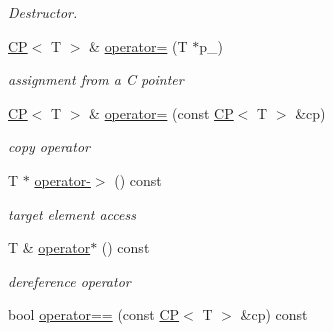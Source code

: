 \begin{DoxyCompactItemize}
\begin{DoxyCompactList}\small\item\em Destructor. \item\end{DoxyCompactList}\item 
\hypertarget{classhdnum_1_1CP_acadabf2279d172f35acb2a7d2f708776}{
\hyperlink{classhdnum_1_1CP}{CP}$<$ T $>$ \& \hyperlink{classhdnum_1_1CP_acadabf2279d172f35acb2a7d2f708776}{operator=} (T $\ast$p\_\-)}
\label{classhdnum_1_1CP_acadabf2279d172f35acb2a7d2f708776}

\begin{DoxyCompactList}\small\item\em assignment from a C pointer \item\end{DoxyCompactList}\item 
\hypertarget{classhdnum_1_1CP_ae98fff24e4e6e981f86f04aa2241324a}{
\hyperlink{classhdnum_1_1CP}{CP}$<$ T $>$ \& \hyperlink{classhdnum_1_1CP_ae98fff24e4e6e981f86f04aa2241324a}{operator=} (const \hyperlink{classhdnum_1_1CP}{CP}$<$ T $>$ \&cp)}
\label{classhdnum_1_1CP_ae98fff24e4e6e981f86f04aa2241324a}

\begin{DoxyCompactList}\small\item\em copy operator \item\end{DoxyCompactList}\item 
\hypertarget{classhdnum_1_1CP_a2b24f8dfb8382e01a16a17ae4d65c68f}{
T $\ast$ \hyperlink{classhdnum_1_1CP_a2b24f8dfb8382e01a16a17ae4d65c68f}{operator-\/$>$} () const }
\label{classhdnum_1_1CP_a2b24f8dfb8382e01a16a17ae4d65c68f}

\begin{DoxyCompactList}\small\item\em target element access \item\end{DoxyCompactList}\item 
\hypertarget{classhdnum_1_1CP_a923fbd611e128b2c45edd3f6d2ff9326}{
T \& \hyperlink{classhdnum_1_1CP_a923fbd611e128b2c45edd3f6d2ff9326}{operator$\ast$} () const }
\label{classhdnum_1_1CP_a923fbd611e128b2c45edd3f6d2ff9326}

\begin{DoxyCompactList}\small\item\em dereference operator \item\end{DoxyCompactList}\item 
\hypertarget{classhdnum_1_1CP_a9d8b201344b1cf82d1e9b1012efdff8f}{
bool \hyperlink{classhdnum_1_1CP_a9d8b201344b1cf82d1e9b1012efdff8f}{operator==} (const \hyperlink{classhdnum_1_1CP}{CP}$<$ T $>$ \&cp) const }
\label{classhdnum_1_1CP_a9d8b201344b1cf82d1e9b1012efdff8f}


\end{DoxyCompactItemize}
